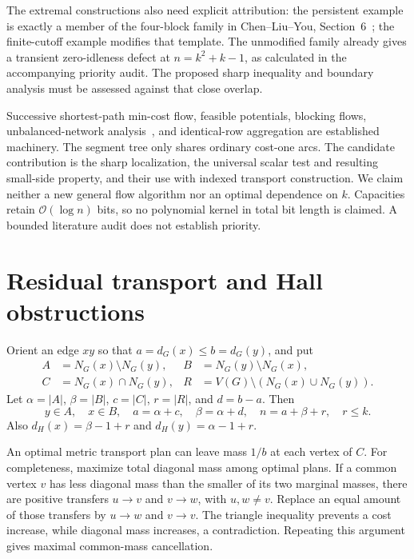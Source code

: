 \documentclass[11pt]{article}
\theoremstyle{remark}
\newcommand{\Oh}{\mathcal O}
\newcommand{\NGraph}{N_G}
\begin{document}
The extremal constructions also need explicit attribution: the persistent example is exactly a member of the four-block family in Chen--Liu--You, Section~6~\cite{chen}; the finite-cutoff example modifies that template. The unmodified family already gives a transient zero-idleness defect at $n=k^2+k-1$, as calculated in the accompanying priority audit. The proposed sharp inequality and boundary analysis must be assessed against that close overlap.

Successive shortest-path min-cost flow, feasible potentials, blocking flows, unbalanced-network analysis~\cite{aost}, and identical-row aggregation are established machinery. The segment tree only shares ordinary cost-one arcs. The candidate contribution is the sharp localization, the universal scalar test and resulting small-side property, and their use with indexed transport construction. We claim neither a new general flow algorithm nor an optimal dependence on $k$. Capacities retain $\Oh(\log n)$ bits, so no polynomial kernel in total bit length is claimed. A bounded literature audit does not establish priority.

\section{Residual transport and Hall obstructions}\label{sec:hall}

Orient an edge $xy$ so that $a=d_G(x)\le b=d_G(y)$, and put
\begin{align*}
 A&=\NGraph(x)\setminus\NGraph(y),& B&=\NGraph(y)\setminus\NGraph(x),\\
 C&=\NGraph(x)\cap\NGraph(y),& R&=V(G)\setminus(\NGraph(x)\cup\NGraph(y)).
\end{align*}
Let $\alpha=|A|$, $\beta=|B|$, $c=|C|$, $r=|R|$, and $d=b-a$. Then
\begin{equation}\label{eq:bookkeeping}
 y\in A,\quad x\in B,\quad a=\alpha+c,\quad
 \beta=\alpha+d,\quad n=a+\beta+r,\quad r\le k.
\end{equation}
Also $d_H(x)=\beta-1+r$ and $d_H(y)=\alpha-1+r$.

An optimal metric transport plan can leave mass $1/b$ at each vertex of $C$. For completeness, maximize total diagonal mass among optimal plans. If a common vertex $v$ has less diagonal mass than the smaller of its two marginal masses, there are positive transfers $u\to v$ and $v\to w$, with $u,w\ne v$. Replace an equal amount of those transfers by $u\to w$ and $v\to v$. The triangle inequality prevents a cost increase, while diagonal mass increases, a contradiction. Repeating this argument gives maximal common-mass cancellation.
\end{document}
